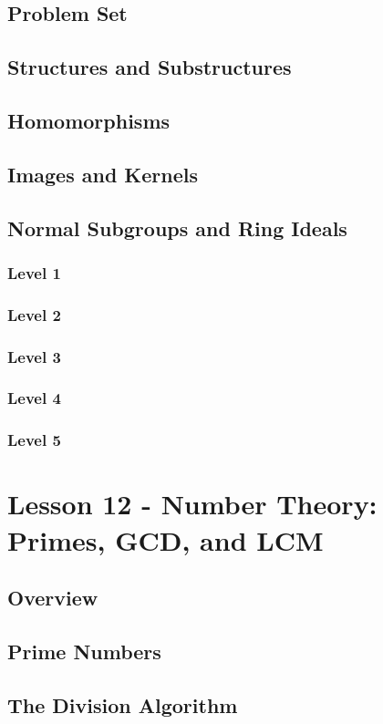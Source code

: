 \documentclass{article}
\begin{document}
\subsection{Problem Set}
\subsection{Structures and Substructures}
\subsection{Homomorphisms}
\subsection{Images and Kernels}
\subsection{Normal Subgroups and Ring Ideals}
\subsubsection{Level 1}
\subsubsection{Level 2}
\subsubsection{Level 3}
\subsubsection{Level 4}
\subsubsection{Level 5}
\pagebreak

\section{Lesson 12 - Number Theory: Primes, GCD, and LCM}
\subsection{Overview}
\subsection{Prime Numbers}
\subsection{The Division Algorithm}
\end{document}
